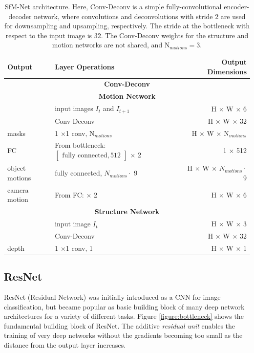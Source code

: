 {
\begin{table}[h]
\centering
\begin{tabular}{llr}
\toprule
\textbf{Output} & \textbf{Layer Operations} & \textbf{Output Dimensions} \\
\midrule\midrule
\multicolumn{3}{c}{\textbf{Conv-Deconv}}\\
\midrule
\multicolumn{3}{c}{\textbf{Motion Network}}\\
\midrule
 & input images $I_t$ and $I_{t+1}$ & H $\times$ W $\times$ 6 \\
 & Conv-Deconv & H $\times$ W $\times$ 32 \\
masks & 1 $\times$1 conv, N$_{motions}$ & H $\times$ W $\times$ N$_{motions}$ \\
FC & From bottleneck: $\begin{bmatrix}\textrm{fully connected}, 512\end{bmatrix}$ $\times$ 2 & 1 $\times$ 512 \\
object motions & fully connected, $N_{motions} \cdot$ 9 & H $\times$ W $\times$ $N_{motions} \cdot$ 9 \\
camera motion & From FC: $\times$ 2 & H $\times$ W $\times$ 6 \\
\midrule
\multicolumn{3}{c}{\textbf{Structure Network}}\\
\midrule
& input image $I_t$ & H $\times$ W $\times$ 3 \\
& Conv-Deconv & H $\times$ W $\times$ 32 \\
depth & 1 $\times$1 conv, 1  & H $\times$ W $\times$ 1 \\
\bottomrule


\end{tabular}

\caption {
SfM-Net \cite{SfmNet} architecture. Here, Conv-Deconv is a simple fully-convolutional
encoder-decoder network, where convolutions and deconvolutions with stride 2 are
used for downsampling and upsampling, respectively. The stride at the bottleneck
with respect to the input image is 32.
The Conv-Deconv weights for the structure and motion networks are not shared,
and N$_{motions} = 3$.
}
\label{table:sfmnet}
\end{table}
}

\subsection{ResNet}
\label{ssec:resnet}
ResNet (Residual Network) \cite{ResNet} was initially introduced as a CNN for image classification, but
became popular as basic building block of many deep network architectures for a variety
of different tasks. Figure \ref{figure:bottleneck}
shows the fundamental building block of ResNet. The additive \emph{residual unit} enables the training
of very deep networks without the gradients becoming too small as the distance
from the output layer increases.

